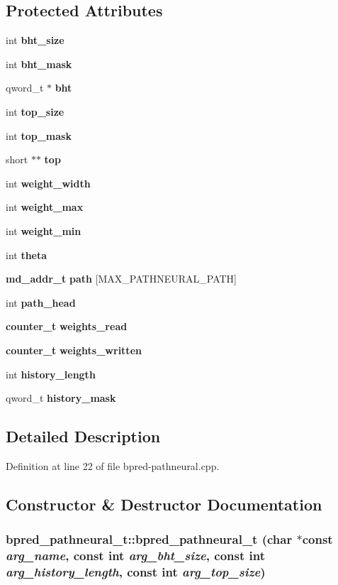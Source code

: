 \subsection*{Protected Attributes}
\begin{CompactItemize}
\item 
int {\bf bht\_\-size}
\item 
int {\bf bht\_\-mask}
\item 
qword\_\-t $\ast$ {\bf bht}
\item 
int {\bf top\_\-size}
\item 
int {\bf top\_\-mask}
\item 
short $\ast$$\ast$ {\bf top}
\item 
int {\bf weight\_\-width}
\item 
int {\bf weight\_\-max}
\item 
int {\bf weight\_\-min}
\item 
int {\bf theta}
\item 
{\bf md\_\-addr\_\-t} {\bf path} [MAX\_\-PATHNEURAL\_\-PATH]
\item 
int {\bf path\_\-head}
\item 
{\bf counter\_\-t} {\bf weights\_\-read}
\item 
{\bf counter\_\-t} {\bf weights\_\-written}
\item 
int {\bf history\_\-length}
\item 
qword\_\-t {\bf history\_\-mask}
\end{CompactItemize}


\subsection{Detailed Description}


Definition at line 22 of file bpred-pathneural.cpp.

\subsection{Constructor \& Destructor Documentation}
\subsubsection[{bpred\_\-pathneural\_\-t}]{\setlength{\rightskip}{0pt plus 5cm}bpred\_\-pathneural\_\-t::bpred\_\-pathneural\_\-t (char $\ast$const  {\em arg\_\-name}, \/  const int {\em arg\_\-bht\_\-size}, \/  const int {\em arg\_\-history\_\-length}, \/  const int {\em arg\_\-top\_\-size})\hspace{0.3cm}{\tt  [inline]}}\label{classbpred__pathneural__t_9d0413280218e02aea9d5b51a4f3fcd4}




